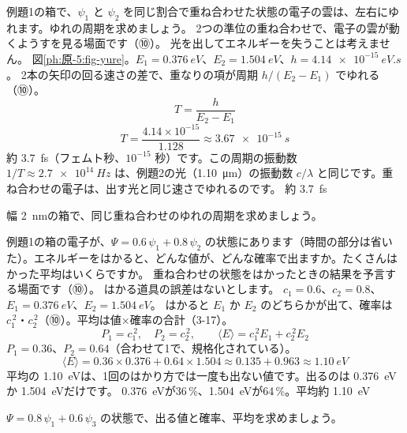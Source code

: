 \label{ph:原-5:ex8}
\begin{phreidai}[重ね合わせの雲がゆれる周期]
例題1の箱で、$\psi_1$ と $\psi_2$ を同じ割合で重ね合わせた状態の電子の雲は、左右にゆれます。ゆれの周期を求めましょう。
\phbamen
2つの準位の重ね合わせで、電子の雲が動くようすを見る場面です（⑩）。
\phmushi
光を出してエネルギーを失うことは考えません。
\phzu
図\ref{ph:原-5:fig-yure}。$E_1=\qty{0.376}{eV}$、$E_2=\qty{1.504}{eV}$、$h=\qty{4.14e-15}{eV.s}$。
\phriyu
2本の矢印の回る速さの差で、重なりの項が周期 $h/(E_2-E_1)$ でゆれる（⑩）。
\phtateru
\[T=\frac{h}{E_2-E_1}\]
\phtoku
\[T=\frac{4.14\times10^{-15}}{1.128}\approx\qty{3.67e-15}{s}\]
\phtashikame
約 \qty{3.7}{fs}（フェムト秒、$10^{-15}$ 秒）です。この周期の振動数 $1/T\approx\qty{2.7e14}{Hz}$ は、例題2の光（\qty{1.10}{\micro m}）の振動数 $c/\lambda$ と同じです。重ね合わせの電子は、出す光と同じ速さでゆれるのです。
\kotae 約 \qty{3.7}{fs}
\end{phreidai}
\begin{jibun}
幅 \qty{2}{nm}の箱で、同じ重ね合わせのゆれの周期を求めましょう。
\end{jibun}

\label{ph:原-5:ex9}
\begin{phreidai}[重ね合わせの状態のエネルギーをはかる]
例題1の箱の電子が、$\Psi=0.6\,\psi_1+0.8\,\psi_2$ の状態にあります（時間の部分は省いた）。エネルギーをはかると、どんな値が、どんな確率で出ますか。たくさんはかった平均はいくらですか。
\phbamen
重ね合わせの状態をはかったときの結果を予言する場面です（⑩）。
\phmushi
はかる道具の誤差はないとします。
\phzu
$c_1=0.6$、$c_2=0.8$、$E_1=\qty{0.376}{eV}$、$E_2=\qty{1.504}{eV}$。
\phriyu
はかると $E_1$ か $E_2$ のどちらかが出て、確率は $c_1^{\,2}$・$c_2^{\,2}$（⑩）。平均は値×確率の合計（3-17）。
\phtateru
\[P_1=c_1^{\,2},\quad P_2=c_2^{\,2},\qquad\langle E\rangle=c_1^{\,2}E_1+c_2^{\,2}E_2\]
\phtoku
$P_1=0.36$、$P_2=0.64$（合わせて1で、規格化されている）。
\[\langle E\rangle=0.36\times0.376+0.64\times1.504\approx0.135+0.963\approx\qty{1.10}{eV}\]
\phtashikame
平均の \qty{1.10}{eV}は、1回のはかり方では一度も出ない値です。出るのは \qty{0.376}{eV}か \qty{1.504}{eV}だけです。
\kotae \qty{0.376}{eV}が36\,\%、\qty{1.504}{eV}が64\,\%。平均約 \qty{1.10}{eV}
\end{phreidai}
\begin{jibun}
$\Psi=0.8\,\psi_1+0.6\,\psi_3$ の状態で、出る値と確率、平均を求めましょう。
\end{jibun}

